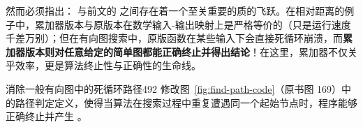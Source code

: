 然而必须指出： 与前文的  之间存在着一个至关重要的质的飞跃。在相对距离的例子中，累加器版本与原版本在数学输入-输出映射上是严格等价的（只是运行速度千差万别）；但在有向图搜索中，原版函数在某些输入下会直接死循环崩溃，而\textbf{累加器版本则对任意给定的简单图都能正确终止并得出结论}！在这里，累加器不仅关乎效率，更是算法终止性与正确性的生命线。

\begin{exercise}{消除一般有向图中的死循环路径}{492}
修改图~\ref{fig:find-path-code}（原书图 169）中的路径判定定义，使得当算法在搜索过程中重复遭遇同一个起始节点时，程序能够正确终止并产生 。
\end{exercise}
